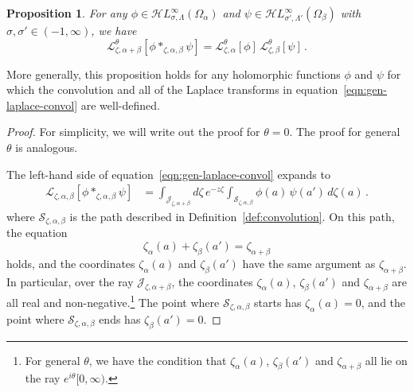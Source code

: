 \documentclass{article}
\newcommand{\singexp}[2]{\mathcal{H}L^\infty_{#1, #2}}
\newcommand{\laplace}{\mathcal{L}}
\theoremstyle{definition}
\theoremstyle{plain}
\newtheorem{prop}[definition]{Proposition}
\begin{document}
\begin{prop}
For any $\phi\in\singexp{\sigma}{\Lambda}(\Omega_\alpha)$ and $\psi\in\singexp{\sigma'}{\Lambda'}(\Omega_\beta)$ with $\sigma,\sigma'\in (-1,\infty)$, we have
\begin{equation}\label{eqn:gen-laplace-convol}
\laplace^\theta_{\zeta,\alpha+\beta}[\phi \ast_{\zeta,\alpha,\beta} \psi] = \laplace^\theta_{\zeta,\alpha}[\phi]\,\laplace^\theta_{\zeta,\beta}[\psi]\,.
\end{equation}    
\end{prop}
More generally, this proposition holds for any holomorphic functions $\phi$ and $\psi$ for which the convolution and all of the Laplace transforms in equation~\eqref{eqn:gen-laplace-convol} are well-defined.
\begin{proof}
For simplicity, we will write out the proof for $\theta = 0$. The proof for general $\theta$ is analogous.

The left-hand side of equation~\eqref{eqn:gen-laplace-convol} expands to
\begin{align*}
\laplace_{\zeta,\alpha,\beta}[\phi \ast_{\zeta,\alpha, \beta} \psi] &= \int_{\mathcal{J}_{\zeta, \alpha+\beta}} d\zeta\,e^{-z\zeta}\int_{\mathcal{S}_{\zeta,\alpha,\beta}} \phi(a)\,\psi(a')\, d\zeta(a)\,.
\end{align*}
where $\mathcal{S}_{\zeta, \alpha, \beta}$ is the path described in Definition~\ref{def:convolution}. On this path, the equation
\begin{equation}\label{eq:slice-plane}
\zeta_\alpha(a) + \zeta_\beta(a') = \zeta_{\alpha+\beta}
\end{equation}
holds, and the coordinates $\zeta_\alpha(a)$ and $\zeta_\beta(a')$ have the same argument as $\zeta_{\alpha+\beta}$. In particular, over the ray $\mathcal{J}_{\zeta, \alpha+\beta}$, the coordinates $\zeta_\alpha(a)$, $\zeta_\beta(a')$ and $\zeta_{\alpha+\beta}$ are all real and non-negative.\footnote{For general $\theta$, we have the condition that $\zeta_\alpha(a)$, $\zeta_\beta(a')$ and $\zeta_{\alpha+\beta}$ all lie on the ray $e^{i\theta}[0, \infty)$.} The point where $\mathcal{S}_{\zeta, \alpha, \beta}$ starts has $\zeta_\alpha(a) = 0$, and the point where $\mathcal{S}_{\zeta, \alpha, \beta}$ ends has $\zeta_\beta(a') = 0$.


\end{proof}
\end{document}
